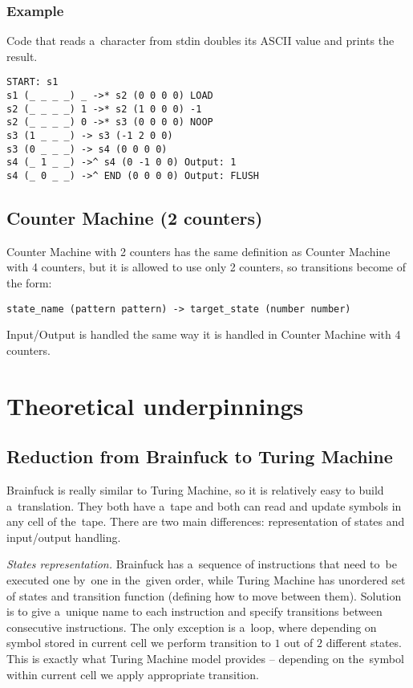 \documentclass[english,shortabstract,mgr]{iithesis}
\begin{document}
\subsection{Example}

Code that reads a~character from stdin doubles its ASCII value and prints the result.
\begin{verbatim}
START: s1
s1 (_ _ _ _) _ ->* s2 (0 0 0 0) LOAD
s2 (_ _ _ _) 1 ->* s2 (1 0 0 0) -1
s2 (_ _ _ _) 0 ->* s3 (0 0 0 0) NOOP
s3 (1 _ _ _) -> s3 (-1 2 0 0)
s3 (0 _ _ _) -> s4 (0 0 0 0)
s4 (_ 1 _ _) ->^ s4 (0 -1 0 0) Output: 1
s4 (_ 0 _ _) ->^ END (0 0 0 0) Output: FLUSH
\end{verbatim}

\section {Counter Machine (2 counters)}

Counter Machine with 2 counters has the same definition as
Counter Machine with 4 counters, but it is allowed to use only
2 counters, so transitions become of the form:

\begin{verbatim}
state_name (pattern pattern) -> target_state (number number)
\end{verbatim}

Input/Output is handled the same way it is handled in Counter Machine with 4 counters.


\chapter{Theoretical underpinnings}

\section {Reduction from Brainfuck to Turing Machine}

Brainfuck is really similar to Turing Machine, so it is relatively easy to build
a~translation. They both have a~tape and both can read and update symbols in any
cell of the~tape. There are two main differences: representation of states and
input/output handling.

\textit{States representation.}
Brainfuck has a~sequence of instructions that need to~be
executed one by~one in the~given order, while Turing Machine has unordered set
of states and transition function (defining how to move between them). Solution
is to give a~unique name to each instruction and specify transitions between
consecutive instructions. The only exception is a~loop, where depending on
symbol stored in current cell we perform transition to $1$ out of $2$ different states.
This is exactly what Turing Machine model provides -- depending on the~symbol
within current cell we apply appropriate transition.
\end{document}
